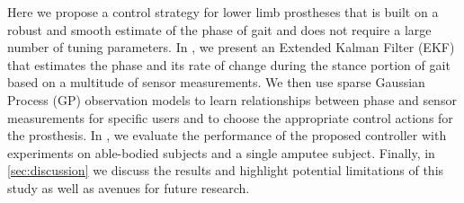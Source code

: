 Here we propose a control strategy for lower limb prostheses that is built on a
robust and smooth estimate of the phase of gait and does not require a large
number of tuning parameters. In , we present an Extended
Kalman Filter (EKF) that estimates the phase and its rate of change during the
stance portion of gait based on a multitude of sensor measurements.  We then use
sparse Gaussian Process (GP) observation models to learn relationships between
phase and sensor measurements for specific users and to choose the appropriate
control actions for the prosthesis. In , we evaluate the
performance of the proposed controller with experiments on able-bodied subjects
and a single amputee subject. Finally, in \cref{sec:discussion} we discuss the
results and highlight potential limitations of this study as well as avenues for
future research.
